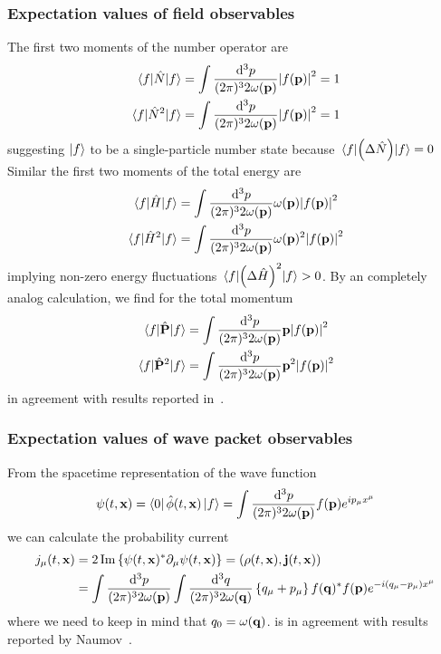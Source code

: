 \subsubsection{Expectation values of field observables}

The first two moments of the number operator are
\begin{align}
	\expval{\hat{N}}{f}
	&=
	\int\frac{\dd[3]{p}}{(2\pi)^32\omega(\vb{p})}
	\abs{f(\vb{p})}^2
	=
	1
	\\
	\expval{\hat{N}^2}{f}
	&=
	\int\frac{\dd[3]{p}}{(2\pi)^32\omega(\vb{p})}
	\abs{f(\vb{p})}^2
	=
	1
\end{align}
suggesting $\ket{f}$ to be a single-particle number state because $\expval{\left(\Delta\hat{N}\right)}{f}=0$
Similar the first two moments of the total energy are
\begin{align}
	\expval{\hat{H}}{f}
	&=
	\int\frac{\dd[3]{p}}{(2\pi)^32\omega(\vb{p})}
	\omega(\vb{p})
	\abs{f(\vb{p})}^2
	\\
	\expval{\hat{H}^2}{f}
	&=
	\int\frac{\dd[3]{p}}{(2\pi)^32\omega(\vb{p})}
	\omega(\vb{p})^2
	\abs{f(\vb{p})}^2
\end{align}
implying non-zero energy fluctuations $\expval{\left(\Delta\hat{H}\right)^2}{f}>0$.
By an completely analog calculation, we find for the total momentum
\begin{align}
	\expval{\hat{\vb{P}}}{f}
	&=
	\int\frac{\dd[3]{p}}{(2\pi)^32\omega(\vb{p})}
	\vb{p}
	\abs{f(\vb{p})}^2
	\\
	\expval{\hat{\vb{P}}^2}{f}
	&=
	\int\frac{\dd[3]{p}}{(2\pi)^32\omega(\vb{p})}
	\vb{p}^2
	\abs{f(\vb{p})}^2
\end{align}
in agreement with results reported in~\cite[eqs.~10 and 11]{Naumov2013}.

\subsubsection{Expectation values of wave packet observables}

From the spacetime representation of the wave function
\begin{equation}
	\psi(t,\vb{x})
	=
	\bra{0}\hat\phi(t,\vb{x})\ket{f}
	=
	\int\frac{\dd[3]{p}}{(2\pi)^32\omega(\vb{p})}
	f(\vb{p})e^{ip_\mu x^\mu}
\end{equation}
we can calculate the probability current
\begin{equation}
	\begin{split}
		j_\mu(t,\vb{x})
		&=
		2\operatorname{\operatorname{Im}}\left\{
			\psi(t,\vb{x})^*
			\partial_\mu
			\psi(t,\vb{x})
		\right\}
		=
		\left(
			\rho(t,\vb{x}),
			\vb{j}(t,\vb{x})
		\right)
		\\
		&=
		\int\frac{\dd[3]{p}}{(2\pi)^32\omega(\vb{p})}
		\int\frac{\dd[3]{q}}{(2\pi)^32\omega(\vb{q})}
		\left\{
			q_\mu
			+
			p_\mu
		\right\}
		f(\vb{q})^*
		f(\vb{p})
		e^{-i(q_\mu-p_\mu)x^\mu}
	\end{split}
	\label{eq:qkg_probability_current}
\end{equation}
where we need to keep in mind that $q_0=\omega(\vb{q})$.
 is in agreement with results reported by Naumov~\cite[p.~9]{Naumov2013}.

